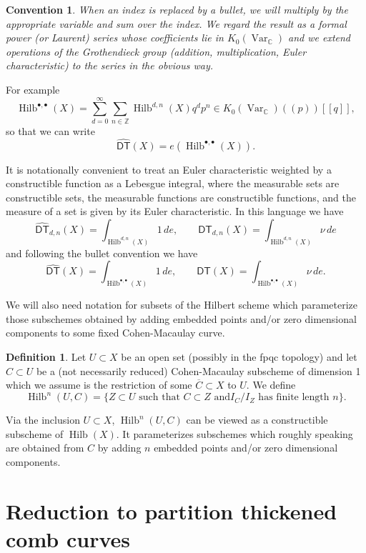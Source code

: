\documentclass[12pt]{amsart}
\newtheorem{convention}{Convention}[theorem]
\theoremstyle{definition}
\newtheorem{definition}[theorem]{Definition}
\newcommand{\CC} {\mathbb{C}}          %
\newcommand{\ZZ} {\mathbb{Z}}		%
\newcommand{\Hilb}{\operatorname{Hilb}}
\newcommand{\DT}{\mathsf{DT}}
\newcommand{\Var}{\operatorname{Var}}
\newcommand{\DThat}{\widehat{\DT}}
\newcommand{\presectionspace}{\vspace{0.2cm}} %
\begin{document}
\begin{convention}\label{conv: bullet convention}
When an index is replaced by a bullet, we will multiply by the
appropriate variable and sum over the index. We regard the result as a
formal power (or Laurent) series whose coefficients lie in
$K_{0}(\Var_{\CC})$ and we extend operations of the Grothendieck group
(addition, multiplication, Euler characteristic) to the series in the
obvious way.
\end{convention}

For example
\[
\Hilb^{\bullet ,\bullet}(X) = \sum_{d=0}^{\infty}\sum_{n\in \ZZ}
\Hilb^{d,n}(X) q^{d}p^{n}\in K_{0}(\Var_{\CC})(\!(p)\!)[[q]],
\]
so that we can write
\[
\DThat (X) = e(\Hilb^{\bullet ,\bullet}(X)).
\]

It is notationally convenient to treat an Euler characteristic
weighted by a constructible function as a Lebesgue integral, where the
measurable sets are constructible sets, the measurable functions are
constructible functions, and the measure of a set is given by its
Euler characteristic. In this language we have
\[
\DThat_{d ,n}(X) =  \int_{\Hilb^{d ,n}(X)} 1\, de, \quad \quad
\DT_{d ,n}(X) = \int_{\Hilb^{d ,n}(X)} \nu \, de
\]
and following the bullet convention we have
\[
\DThat(X) =  \int_{\Hilb^{\bullet ,\bullet }(X)} 1\, de, \quad \quad
\DT(X) = \int_{\Hilb^{\bullet ,\bullet }(X)} \nu \, de.
\]

We will also need notation for subsets of the Hilbert scheme which
parameterize those subschemes obtained by adding embedded points
and/or zero dimensional components to
some fixed Cohen-Macaulay curve.

\begin{definition}\label{defn: Hilb(U,C)}
Let $U\subset X$ be an open set (possibly in the fpqc topology) and
let $C\subset U$ be a (not necessarily reduced)
Cohen-Macaulay subscheme of dimension 1 which we assume is the
restriction of some $\overline{C}\subset X$ to $U$. We define 
\[
\Hilb^{n}(U,C) = \{Z\subset U\text{ such that }C\subset Z\text{ and
$I_{C}/I_{Z}$ has finite length $n$} \}.
\]
\end{definition}
Via the inclusion $U\subset X$, $\Hilb^{n}(U,C)$ can be viewed as a
constructible subscheme of $\Hilb (X)$. It parameterizes subschemes
which roughly speaking are obtained from $C$ by adding $n$ embedded
points and/or zero dimensional components.

\presectionspace
\section{Reduction to partition thickened comb curves}\label{sec: reduction to thickened comb curves}
\end{document}
